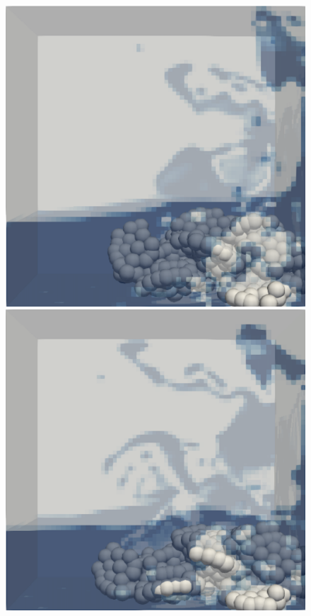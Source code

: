 \begin{figure}[H]
\begin{minipage}{.4\textwidth}
    \end{minipage}
    \newline
    \begin{minipage}{.4\textwidth}
        \centering
        \includegraphics[width=\linewidth]{GWU_Thesis_Sarmakeeva/Images/chap4/landslide_5.png}
    \end{minipage}%
    \hspace{0.06\textwidth}
    \begin{minipage}{.4\textwidth}
        \centering
        \includegraphics[width=\linewidth]{GWU_Thesis_Sarmakeeva/Images/chap4/landslide_6.png}

\end{minipage}
\end{figure}
